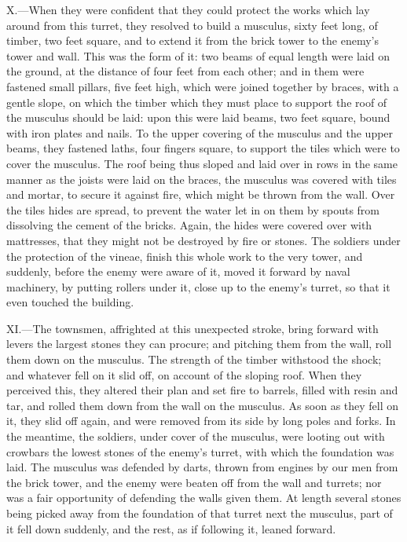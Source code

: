 X.—When they were confident that they could protect the works which lay
around from this turret, they resolved to build a musculus, sixty feet
long, of timber, two feet square, and to extend it from the brick tower
to the enemy's tower and wall. This was the form of it: two beams of
equal length were laid on the ground, at the distance of four feet from
each other; and in them were fastened small pillars, five feet high,
which were joined together by braces, with a gentle slope, on which the
timber which they must place to support the roof of the musculus should
be laid: upon this were laid beams, two feet square, bound with iron
plates and nails. To the upper covering of the musculus and the upper
beams, they fastened laths, four fingers square, to support the tiles
which were to cover the musculus. The roof being thus sloped and laid
over in rows in the same manner as the joists were laid on the braces,
the musculus was covered with tiles and mortar, to secure it against
fire, which might be thrown from the wall. Over the tiles hides are
spread, to prevent the water let in on them by spouts from dissolving
the cement of the bricks. Again, the hides were covered over with
mattresses, that they might not be destroyed by fire or stones. The
soldiers under the protection of the vineae, finish this whole work to
the very tower, and suddenly, before the enemy were aware of it, moved
it forward by naval machinery, by putting rollers under it, close up to
the enemy's turret, so that it even touched the building.

XI.—The townsmen, affrighted at this unexpected stroke, bring forward
with levers the largest stones they can procure; and pitching them from
the wall, roll them down on the musculus. The strength of the timber
withstood the shock; and whatever fell on it slid off, on account of the
sloping roof. When they perceived this, they altered their plan and set
fire to barrels, filled with resin and tar, and rolled them down from
the wall on the musculus. As soon as they fell on it, they slid off
again, and were removed from its side by long poles and forks. In the
meantime, the soldiers, under cover of the musculus, were looting out
with crowbars the lowest stones of the enemy's turret, with which the
foundation was laid. The musculus was defended by darts, thrown from
engines by our men from the brick tower, and the enemy were beaten off
from the wall and turrets; nor was a fair opportunity of defending the
walls given them. At length several stones being picked away from the
foundation of that turret next the musculus, part of it fell down
suddenly, and the rest, as if following it, leaned forward.


